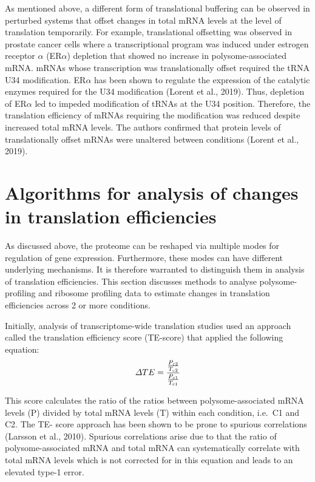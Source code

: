 \documentclass[
  12pt,
  openany]{book}
\begin{document}
As mentioned above, a different form of translational buffering can be observed in perturbed systems that offset changes in total mRNA levels at the level of translation temporarily. For example, translational offsetting was observed in prostate cancer cells where a transcriptional program was induced under estrogen receptor \(\alpha\) (ER\(\alpha\)) depletion that showed no increase in polysome-associated mRNA. mRNAs whose transcription was translationally offset required the tRNA U34 modification. ER\(\alpha\) has been shown to regulate the expression of the catalytic enzymes required for the U34 modification (Lorent et al., 2019). Thus, depletion of ER\(\alpha\) led to impeded modification of tRNAs at the U34 position. Therefore, the translation efficiency of mRNAs requiring the modification was reduced despite increased total mRNA levels. The authors confirmed that protein levels of translationally offset mRNAs were unaltered between conditions (Lorent et al., 2019).
\newline

\section{Algorithms for analysis of changes in translation efficiencies}\label{algorithm}

As discussed above, the proteome can be reshaped via multiple modes for regulation of gene expression. Furthermore, these modes can have different underlying mechanisms. It is therefore warranted to distinguish them in analysis of translation efficiencies. This section discusses methods to analyse polysome-profiling and ribosome profiling data to estimate changes in translation efficiencies across 2 or more conditions.

Initially, analysis of transcriptome-wide translation studies used an approach called the translation efficiency score (TE-score) that applied the following equation:
\[\varDelta TE = \frac{\frac{P_{c2}}{T_{c2}}} {\frac{P_{c1}}{T_{c1}}}\\\]

This score calculates the ratio of the ratios between polysome-associated mRNA levels (P) divided by total mRNA levels (T) within each condition, i.e.~C1 and C2. The TE- score approach has been shown to be prone to spurious correlations (Larsson et al., 2010). Spurious correlations arise due to that the ratio of polysome-associated mRNA and total mRNA can systematically correlate with total mRNA levels which is not corrected for in this equation and leads to an elevated type-1 error.
\end{document}
